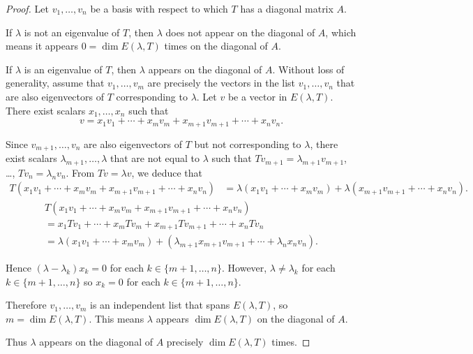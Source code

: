 \begin{proof}
    Let $v_{1}, \ldots, v_{n}$ be a basis with respect to which $T$ has a diagonal matrix $A$.

    If $\lambda$ is not an eigenvalue of $T$, then $\lambda$ does not appear on the diagonal of $A$, which means it appears $0 = \dim E(\lambda, T)$ times on the diagonal of $A$.

    If $\lambda$ is an eigenvalue of $T$, then $\lambda$ appears on the diagonal of $A$. Without loss of generality, assume that $v_{1}, \ldots, v_{m}$ are precisely the vectors in the list $v_{1}, \ldots, v_{n}$ that are also eigenvectors of $T$ corresponding to $\lambda$. Let $v$ be a vector in $E(\lambda, T)$. There exist scalars $x_{1}, \ldots, x_{n}$ such that
    \[
        v = x_{1}v_{1} + \cdots + x_{m}v_{m} + x_{m+1}v_{m+1} + \cdots + x_{n}v_{n}.
    \]

    Since $v_{m+1}, \ldots, v_{n}$ are also eigenvectors of $T$ but not corresponding to $\lambda$, there exist scalars $\lambda_{m+1}, \ldots, \lambda$ that are not equal to $\lambda$ such that $Tv_{m+1} = \lambda_{m+1} v_{m+1}$, \ldots, $Tv_{n} = \lambda_{n}v_{n}$. From $Tv = \lambda v$, we deduce that
    \begin{align*}
        T(x_{1}v_{1} + \cdots + x_{m}v_{m} + x_{m+1}v_{m+1} + \cdots + x_{n}v_{n})
         & = \lambda (x_{1}v_{1} + \cdots + x_{m}v_{m}) + \lambda (x_{m+1}v_{m+1} + \cdots + x_{n}v_{n}).
    \end{align*}
    \begin{multline*}
        T(x_{1}v_{1} + \cdots + x_{m}v_{m} + x_{m+1}v_{m+1} + \cdots + x_{n}v_{n}) \\
        = x_{1}Tv_{1} + \cdots + x_{m}Tv_{m} + x_{m+1}Tv_{m+1} + \cdots + x_{n}Tv_{n} \\
        = \lambda (x_{1}v_{1} + \cdots + x_{m}v_{m}) + (\lambda_{m+1}x_{m+1}v_{m+1} + \cdots + \lambda_{n}x_{n}v_{n}).
    \end{multline*}

    Hence $(\lambda - \lambda_{k})x_{k} = 0$ for each $k\in\{ m+1, \ldots, n \}$. However, $\lambda \ne \lambda_{k}$ for each $k\in\{ m+1, \ldots, n \}$ so $x_{k} = 0$ for each $k\in\{ m+1, \ldots, n \}$.

    Therefore $v_{1}, \ldots, v_{m}$ is an independent list that spans $E(\lambda, T)$, so $m = \dim E(\lambda, T)$. This means $\lambda$ appears $\dim E(\lambda, T)$ on the diagonal of $A$.

    Thus $\lambda$ appears on the diagonal of $A$ precisely $\dim E(\lambda, T)$ times.
\end{proof}
\newpage

